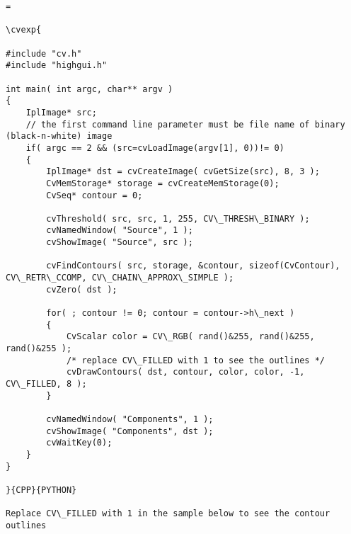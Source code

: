 \begin{verbatim}=

\cvexp{

#include "cv.h"
#include "highgui.h"

int main( int argc, char** argv )
{
    IplImage* src;
    // the first command line parameter must be file name of binary (black-n-white) image
    if( argc == 2 && (src=cvLoadImage(argv[1], 0))!= 0)
    {
        IplImage* dst = cvCreateImage( cvGetSize(src), 8, 3 );
        CvMemStorage* storage = cvCreateMemStorage(0);
        CvSeq* contour = 0;

        cvThreshold( src, src, 1, 255, CV\_THRESH\_BINARY );
        cvNamedWindow( "Source", 1 );
        cvShowImage( "Source", src );

        cvFindContours( src, storage, &contour, sizeof(CvContour), CV\_RETR\_CCOMP, CV\_CHAIN\_APPROX\_SIMPLE );
        cvZero( dst );

        for( ; contour != 0; contour = contour->h\_next )
        {
            CvScalar color = CV\_RGB( rand()&255, rand()&255, rand()&255 );
            /* replace CV\_FILLED with 1 to see the outlines */
            cvDrawContours( dst, contour, color, color, -1, CV\_FILLED, 8 );
        }

        cvNamedWindow( "Components", 1 );
        cvShowImage( "Components", dst );
        cvWaitKey(0);
    }
}

}{CPP}{PYTHON}

Replace CV\_FILLED with 1 in the sample below to see the contour outlines


\end{verbatim}
